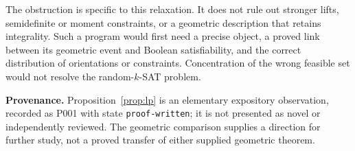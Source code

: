 

The obstruction is specific to this relaxation. It does not rule out stronger
lifts, semidefinite or moment constraints, or a geometric description that
retains integrality. Such a program would first need a precise object, a
proved link between its geometric event and Boolean satisfiability, and the
correct distribution of orientations or constraints. Concentration of the
wrong feasible set would not resolve the random-$k$-SAT problem.

\noindent\textbf{Provenance.} Proposition~\ref{prop:lp} is an elementary
expository observation, recorded as P001 with state \texttt{proof-written};
it is not presented as novel or independently reviewed. The geometric
comparison supplies a direction for further study, not a proved transfer
of either supplied geometric theorem.
